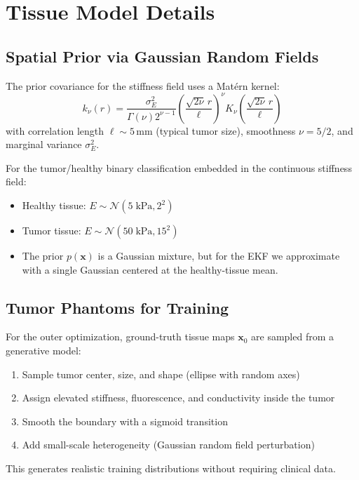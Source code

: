 \documentclass[11pt,a4paper]{article}
\theoremstyle{definition}
\begin{document}
\section{Tissue Model Details}

\subsection{Spatial Prior via Gaussian Random Fields}

The prior covariance for the stiffness field uses a Mat\'{e}rn kernel:
\[
  k_\nu(r) = \frac{\sigma_E^2}{\Gamma(\nu) 2^{\nu-1}} \left(\frac{\sqrt{2\nu} \, r}{\ell}\right)^\nu K_\nu\left(\frac{\sqrt{2\nu} \, r}{\ell}\right)
\]
with correlation length $\ell \sim 5$\,mm (typical tumor size), smoothness $\nu = 5/2$, and marginal variance $\sigma_E^2$.

For the tumor/healthy binary classification embedded in the continuous stiffness field:
\begin{itemize}[nosep]
  \item Healthy tissue: $E \sim \mathcal{N}(5\;\text{kPa}, 2^2)$
  \item Tumor tissue: $E \sim \mathcal{N}(50\;\text{kPa}, 15^2)$
  \item The prior $p(\bm{x})$ is a Gaussian mixture, but for the EKF we approximate with a single Gaussian centered at the healthy-tissue mean.
\end{itemize}

\subsection{Tumor Phantoms for Training}

For the outer optimization, ground-truth tissue maps $\bm{x}_0$ are sampled from a generative model:
\begin{enumerate}[nosep]
  \item Sample tumor center, size, and shape (ellipse with random axes)
  \item Assign elevated stiffness, fluorescence, and conductivity inside the tumor
  \item Smooth the boundary with a sigmoid transition
  \item Add small-scale heterogeneity (Gaussian random field perturbation)
\end{enumerate}

This generates realistic training distributions without requiring clinical data.
\end{document}
